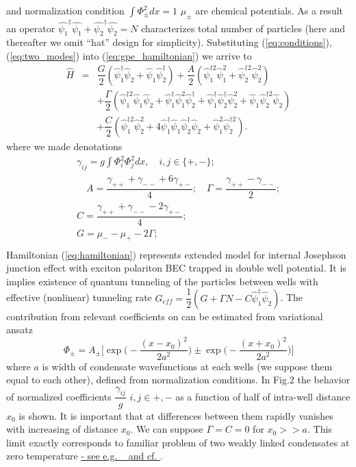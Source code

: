 \documentclass[aps,prl,preprint,groupedaddress]{revtex4-1}
\begin{document}
and  normalization condition $\int \Phi_{\pm}^2 dx = 1$ $\mu_{\pm}$ are chemical  potentials. As a result an operator $\hat{\psi_1}^\dag\hat{\psi_1} + \hat{\psi_2}^\dag\hat{\psi_2} = N$ characterizes total number of particles (here and thereafter we omit “hat” design for simplicity). Substituting (\ref{eq:conditions}), (\ref{eq:two_modes}) into (\ref{eq:gpe_hamiltonian}) we arrive to 
\begin{equation}
\begin{array}{lcl}
\hat{H} & = & \dfrac{G}{2} (\hat{\psi}_1^\dag \hat{\psi}_2 +  \hat{\psi}_1 \hat{\psi}_2^\dag) + \dfrac{A}{2} (\hat{\psi}_1^{\dag 2} \hat{\psi}_1^2 + \hat{\psi}_2^{\dag 2} \hat{\psi}_2^2) \\[10pt]
& & +\dfrac{\Gamma}{2} (\hat{\psi}_1^{\dag 2} \hat{\psi}_1 \hat{\psi}_2 + \hat{\psi}_1^\dag \hat{\psi}_1^2 \hat{\psi}_2^\dag + \hat{\psi}_1^\dag \hat{\psi}_2^\dag \hat{\psi}_2^2 + \hat{\psi}_1 \hat{\psi}_2^{\dag 2} \hat{\psi}_2) \\[10pt]
& & +\dfrac{C}{2} (\hat{\psi}_1^{\dag 2} \hat{\psi}_2^2 + 4 \hat{\psi}_1^\dag \hat{\psi}_1 \hat{\psi}_2^\dag \hat{\psi}_2 + \hat{\psi}_1^2 \hat{\psi}_2^{\dag 2}).
\end{array}
\label{eq:hamiltonian}
\end{equation}
where  we made denotations 
\begin{equation}
\begin{array}{c}
\gamma_{ij} = g \int \Phi_i^2 \Phi_j^2 dx, \quad i,j \in \{+,-\}; \\[10pt]
\quad A = \dfrac{\gamma_{++} + \gamma_{--} + 6 \gamma_{+-}}{4}; \quad \Gamma = \dfrac{\gamma_{++} - \gamma_{--}}{2}; \\[10pt]
C = \dfrac{\gamma_{++} + \gamma_{--} - 2\gamma_{+-}}{4}; \\[10pt]
G = \mu_- - \mu_+ - 2\Gamma;\\[10pt]
\end{array}
\label{eq:subs}
\end{equation}
Hamiltonian (\ref{eq:hamiltonian}) represents extended model for internal Josephson junction effect with exciton polariton BEC trapped in double well potential. It is implies existence of quantum tunneling of the particles between wells with effective (nonlinear) tunneling rate $G_{eff} = \dfrac{1}{2}(G+\Gamma N - C\hat{\psi}_1^\dag\hat{\psi}_2)$. The contribution from relevant coefficients on can be estimated from variational ansatz 
\begin{equation}
\Phi_{\pm} = A_{\pm} \Big[\exp\Big(-\dfrac{(x-x_0)^2}{2a^2}\Big) \pm \exp\Big(-\dfrac{(x+x_0)^2}{2a^2}\Big)\Big]
\label{eq:two_modes_eq}
\end{equation}
where  $a$ is width of condensate wavefunctions at each wells (we suppose them equal to each other),   defined from normalization conditions. In Fig.2 the behavior  of normalized coefficients $\dfrac{\gamma_{ij}}{g}$ $i,j \in {+,-}$ as a function of  half of intra-well distance $x_0$ is shown. It is important that at differences between them rapidly vanishes with increasing of distance  $x_0$. We can suppose $\Gamma = C = 0$ for $x_0 >> a$. This limit exactly corresponds to familiar problem of two weakly linked  condensates at zero temperature \underline{- see e.g. ~\cite{39} and cf.  }.
\end{document}
